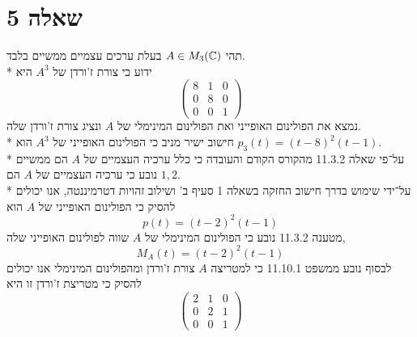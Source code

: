 \section{שאלה 5}
תהי $A \in M_3(\mathbb{C})$ בעלת ערכים עצמיים ממשיים בלבד. \\*
ידוע כי צורת ז'ורדן של $A^3$ היא
\[
	\begin{pmatrix}
		8 & 1 & 0 \\
		0 & 8 & 0 \\
		0 & 0 & 1
	\end{pmatrix}
\]
נמצא את הפולינום האופייני ואת הפולינום המינימלי של $A$ ונציג צורת ז'ורדן שלה. \\*
חישוב ישיר מניב כי הפולינום האופייני של $A^3$ הוא $p_3(t) = {(t - 8)}^2 (t - 1)$. \\*
על־פי שאלה 11.3.2 מהקורס הקודם והעובדה כי כלל ערכיה העצמיים של $A$ הם ממשיים נובע כי ערכיה העצמיים של $A$ הם $1, 2$. \\*
על־ידי שימוש בדרך חישוב החזקה בשאלה 1 סעיף ב' ושילוב זהויות דטרמיננטה, אנו יכולים להסיק כי הפולינום האופייני של $A$ הוא
\[
	p(t) = {(t - 2)}^2 (t - 1)
\]
מטענה 11.3.2 נובע כי הפולינום המינימלי של $A$ שווה לפולינום האופייני שלה,
\[
	M_A(t) = {(t - 2)}^2 (t - 1) 
\]
לבסוף נובע ממשפט 11.10.1 כי למטריצה $A$ צורת ז'ורדן ומהפולינום המינימלי אנו יכולים להסיק כי מטריצת ז'ורדן זו היא
\[
	\begin{pmatrix}
		2 & 1 & 0 \\
		0 & 2 & 1 \\
		0 & 0 & 1
	\end{pmatrix}
\]


